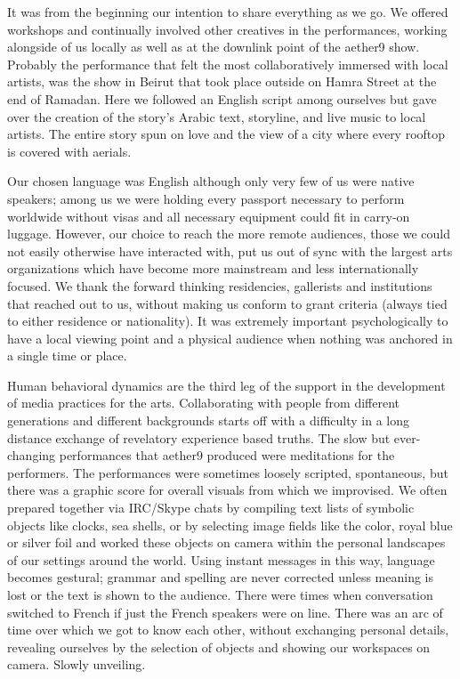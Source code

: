 It was from the beginning our intention to share everything as we go. We offered workshops and continually involved other creatives in the performances, working alongside of us locally as well as at the downlink point of the aether9 show. Probably the performance that felt the most collaboratively immersed with local artists, was the show in Beirut that took place outside on Hamra Street at the end of Ramadan. Here we followed an English script among ourselves but gave over the creation of the story's Arabic text, storyline, and live music to local artists. The entire story spun on love and the view of a city where every rooftop is covered with aerials. 
 
Our chosen language was English although only very few of us were native speakers; among us we were holding every passport necessary to perform worldwide without visas and all necessary equipment could fit in carry-on luggage. However, our choice to reach the more remote audiences, those we could not easily otherwise have interacted with, put us out of sync with the largest arts organizations which have become more mainstream and less internationally focused. We thank the forward thinking residencies, gallerists and institutions that reached out to us, without making us conform to grant criteria (always tied to either residence or nationality). It was extremely important psychologically to have a local viewing point and a physical audience when nothing was anchored in a single time or place.
 
Human behavioral dynamics are the third leg of the support in the development of media practices for the arts. Collaborating with people from different generations and different backgrounds starts off with a difficulty in a long distance exchange of revelatory experience based truths. The slow but ever-changing performances that aether9 produced were meditations for the performers. The performances were sometimes loosely scripted, spontaneous, but there was a graphic score for overall visuals from which we improvised. We often prepared together via IRC/Skype chats by compiling text lists of symbolic objects like clocks, sea shells, or by selecting image fields like the color, royal blue or silver foil and worked these objects on camera within the personal landscapes of our settings around the world. Using instant messages in this way, language becomes gestural; grammar and spelling are never corrected unless meaning is lost or the text is shown to the audience. There were times when conversation switched to French if just the French speakers were on line. There was an arc of time over which we got to know each other, without exchanging personal details, revealing ourselves by the selection of objects and showing our workspaces on camera. Slowly unveiling.
 
